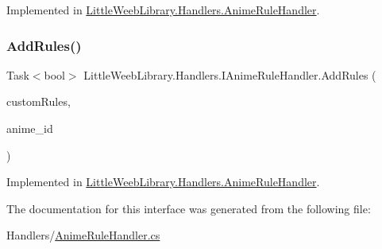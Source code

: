 Implemented in \mbox{\hyperlink{class_little_weeb_library_1_1_handlers_1_1_anime_rule_handler_a503fb2839489e1df8b80c9a461c0fd2b}{Little\+Weeb\+Library.\+Handlers.\+Anime\+Rule\+Handler}}.

\mbox{\label{interface_little_weeb_library_1_1_handlers_1_1_i_anime_rule_handler_ae8bcf661c81733b24b52ce3e180aeac1}} 
\subsubsection{\texorpdfstring{Add\+Rules()}{AddRules()}}
{\footnotesize\ttfamily Task$<$bool$>$ Little\+Weeb\+Library.\+Handlers.\+I\+Anime\+Rule\+Handler.\+Add\+Rules (\begin{DoxyParamCaption}\item[{J\+Object}]{custom\+Rules,  }\item[{string}]{anime\+\_\+id }\end{DoxyParamCaption})}



Implemented in \mbox{\hyperlink{class_little_weeb_library_1_1_handlers_1_1_anime_rule_handler_a469232c6b73d0ceff935c4ef2d78d039}{Little\+Weeb\+Library.\+Handlers.\+Anime\+Rule\+Handler}}.



The documentation for this interface was generated from the following file\+:\begin{DoxyCompactItemize}
\item 
Handlers/\mbox{\hyperlink{_anime_rule_handler_8cs}{Anime\+Rule\+Handler.\+cs}}\end{DoxyCompactItemize}
